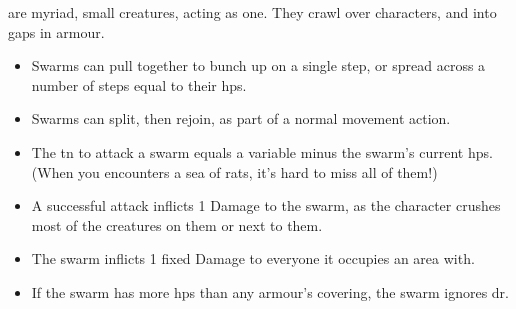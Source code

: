 are myriad, small creatures, acting as one.
They crawl over characters, and into gaps in armour.

\begin{itemize}
  \renewcommand{\arraystretch}{1}
  \item
  Swarms can pull together to bunch up on a single \gls{step}, or spread across a number of \glspl{step} equal to their \glspl{hp}.
  \item
  Swarms can split, then rejoin, as part of a normal movement action.
  \item
  The \gls{tn} to attack a swarm equals a variable minus the swarm's current \glspl{hp}.
  (When you encounters a sea of rats, it's hard to miss all of them!)
  \item
  A successful attack inflicts 1 Damage to the swarm, as the character crushes most of the creatures on them or next to them.
  \item
  The swarm inflicts 1 fixed Damage to everyone it occupies an area with.
  \item
  If the swarm has more \glspl{hp} than any armour's \gls{covering}, the swarm ignores \gls{dr}.
\end{itemize}

